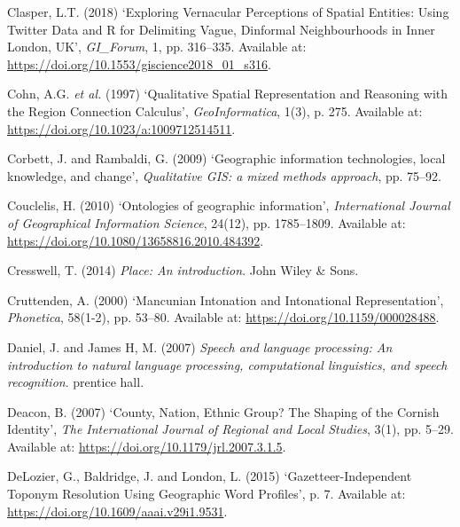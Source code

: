 \documentclass[
  letterpaper,
  11pt,
  english,
  onehalfspacing,
  headsepline]{MastersDoctoralThesis}
\newlength{\cslhangindent}
\newlength{\cslentryspacingunit} %
\newenvironment{CSLReferences}[2] %
 {%
  \setlength{\parindent}{0pt}
  \ifodd #1
  \let\oldpar\par
  \def\par{\hangindent=\cslhangindent\oldpar}
  \fi
  \setlength{\parskip}{#2\cslentryspacingunit}
 }%
 {}
\begin{document}
\begin{CSLReferences}{0}{0}
\leavevmode{}%
Clasper, L.T. (2018) {`Exploring {Vernacular Perceptions} of {Spatial
Entities}: {Using Twitter Data} and {R} for {Delimiting Vague},
{Dinformal Neighbourhoods} in {Inner London}, {UK}'}, \emph{GI\_Forum},
1, pp. 316--335. Available at:
\url{https://doi.org/10.1553/giscience2018_01_s316}.

\leavevmode{}%
Cohn, A.G. \emph{et al.} (1997) {`Qualitative {Spatial Representation}
and {Reasoning} with the {Region Connection Calculus}'},
\emph{GeoInformatica}, 1(3), p. 275. Available at:
\url{https://doi.org/10.1023/a:1009712514511}.

\leavevmode{}%
Corbett, J. and Rambaldi, G. (2009) {`Geographic information
technologies, local knowledge, and change'}, \emph{Qualitative GIS: a
mixed methods approach}, pp. 75--92.

\leavevmode{}%
Couclelis, H. (2010) {`Ontologies of geographic information'},
\emph{International Journal of Geographical Information Science},
24(12), pp. 1785--1809. Available at:
\url{https://doi.org/10.1080/13658816.2010.484392}.

\leavevmode{}%
Cresswell, T. (2014) \emph{Place: An introduction}. {John Wiley \&
Sons}.

\leavevmode{}%
Cruttenden, A. (2000) {`Mancunian {Intonation} and {Intonational
Representation}'}, \emph{Phonetica}, 58(1-2), pp. 53--80. Available at:
\url{https://doi.org/10.1159/000028488}.

\leavevmode{}%
Daniel, J. and James H, M. (2007) \emph{Speech and language processing:
{An} introduction to natural language processing, computational
linguistics, and speech recognition}. {prentice hall}.

\leavevmode{}%
Deacon, B. (2007) {`County, {Nation}, {Ethnic Group}? {The Shaping} of
the {Cornish Identity}'}, \emph{The International Journal of Regional
and Local Studies}, 3(1), pp. 5--29. Available at:
\url{https://doi.org/10.1179/jrl.2007.3.1.5}.

\leavevmode{}%
DeLozier, G., Baldridge, J. and London, L. (2015)
{`Gazetteer-{Independent Toponym Resolution Using Geographic Word
Profiles}'}, p. 7. Available at:
\url{https://doi.org/10.1609/aaai.v29i1.9531}.


\end{CSLReferences}
\end{document}
